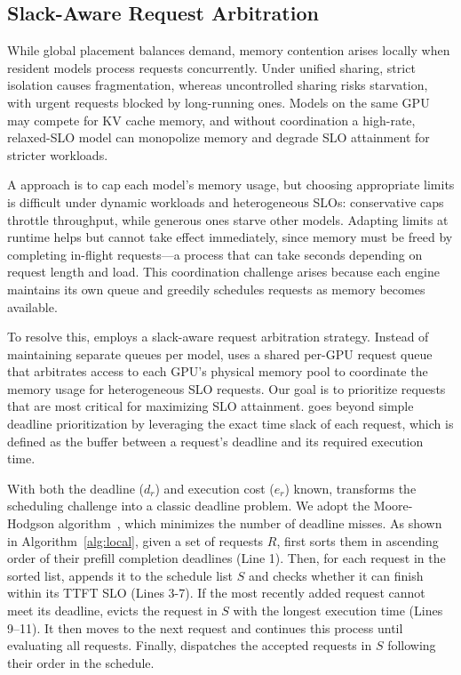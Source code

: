\subsection{Slack-Aware Request Arbitration} \label{sec:sch-gpu}

While global placement balances demand, memory contention arises locally when resident models process requests concurrently. Under unified sharing, strict isolation causes fragmentation, whereas uncontrolled sharing risks starvation, with urgent requests blocked by long-running ones. Models on the same GPU may compete for KV cache memory, and without coordination a high-rate, relaxed-SLO model can monopolize memory and degrade SLO attainment for stricter workloads.

A \naive approach is to cap each model’s memory usage, but choosing appropriate limits is difficult under dynamic workloads and heterogeneous SLOs: conservative caps throttle throughput, while generous ones starve other models. Adapting limits at runtime helps but cannot take effect immediately, since memory must be freed by completing in-flight requests—a process that can take seconds depending on request length and load. This coordination challenge arises because each engine maintains its own queue and greedily schedules requests as memory becomes available.

To resolve this, \tool employs a slack-aware request arbitration strategy. Instead of maintaining separate queues per model, \tool uses a shared per-GPU request queue that arbitrates access to each GPU's physical memory pool to coordinate the memory usage for heterogeneous SLO requests. Our goal is to prioritize requests that are most critical for maximizing SLO attainment. \tool goes beyond simple deadline prioritization by leveraging the exact time slack of each request, which is defined as the buffer between a request's deadline and its required execution time.

With both the deadline ($d_r$) and execution cost ($e_r$) known, \tool transforms the scheduling challenge into a classic deadline problem. We adopt the Moore-Hodgson algorithm~\cite{moore1968n}, which minimizes the number of deadline misses.
As shown in Algorithm~\ref{alg:local}, given a set of requests $R$, \tool first sorts them in ascending order of their prefill completion deadlines (Line 1).
Then, for each request in the sorted list, \tool appends it to the schedule list $S$ and checks whether it can finish within its TTFT SLO (Lines 3-7). 
If the most recently added request cannot meet its deadline, \tool evicts the request in $S$ with the longest execution time (Lines 9–11). It then moves to the next request and continues this process until evaluating all requests.
Finally, \tool dispatches the accepted requests in $S$ following their order in the schedule.

